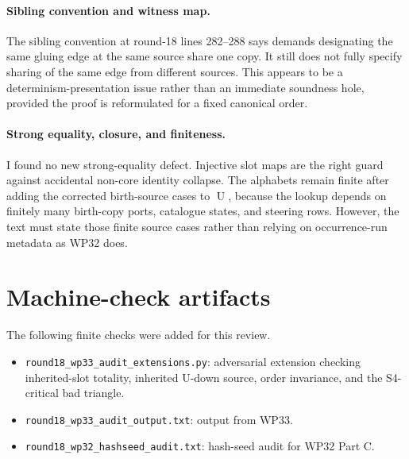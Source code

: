 \documentclass[11pt]{article}
\newcommand{\Uop}{\operatorname{U}}
\newcommand{\code}[1]{\texttt{#1}}
\theoremstyle{remark}
\begin{document}
\paragraph{Sibling convention and witness map.}
The sibling convention at round-18 lines 282--288 says demands designating the same gluing edge at the same source share one copy.  It still does not fully specify sharing of the same edge from different sources.  This appears to be a determinism-presentation issue rather than an immediate soundness hole, provided the proof is reformulated for a fixed canonical order.

\paragraph{Strong equality, closure, and finiteness.}
I found no new strong-equality defect.  Injective slot maps are the right guard against accidental non-core identity collapse.  The alphabets remain finite after adding the corrected birth-source cases to $\Uop$, because the lookup depends on finitely many birth-copy ports, catalogue states, and steering rows.  However, the text must state those finite source cases rather than relying on occurrence-run metadata as WP32 does.

\section{Machine-check artifacts}

The following finite checks were added for this review.
\begin{itemize}
  \item \code{round18\_wp33\_audit\_extensions.py}: adversarial extension checking inherited-slot totality, inherited U-down source, order invariance, and the S4-critical bad triangle.
  \item \code{round18\_wp33\_audit\_output.txt}: output from WP33.
  \item \code{round18\_wp32\_hashseed\_audit.txt}: hash-seed audit for WP32 Part C.
\end{itemize}
\end{document}
